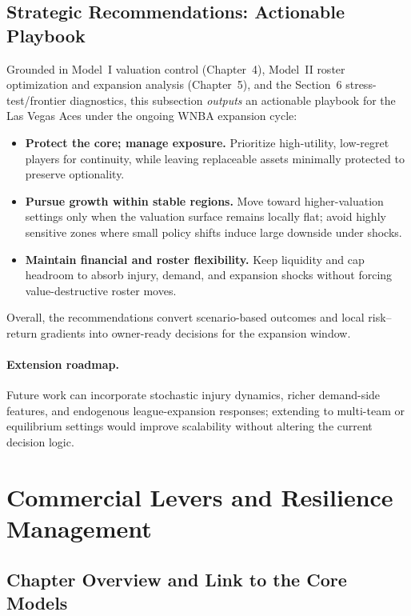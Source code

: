 \documentclass[12pt]{article}
\numberwithin{figure}{section}
\numberwithin{table}{section}
\begin{document}
	\subsection{Strategic Recommendations: Actionable Playbook}
	Grounded in Model~I valuation control (Chapter~4), Model~II roster optimization
	and expansion analysis (Chapter~5), and the Section~6 stress-test/frontier
	diagnostics, this subsection \emph{outputs} an actionable playbook for the Las Vegas Aces under the ongoing WNBA expansion cycle:
	\begin{itemize}
		\item \textbf{Protect the core; manage exposure.}
		Prioritize high-utility, low-regret players for continuity, while leaving
		replaceable assets minimally protected to preserve optionality.
		\item \textbf{Pursue growth within stable regions.}
		Move toward higher-valuation settings only when the valuation surface remains
		locally flat; avoid highly sensitive zones where small policy shifts induce
		large downside under shocks.
		\item \textbf{Maintain financial and roster flexibility.}
		Keep liquidity and cap headroom to absorb injury, demand, and expansion shocks
		without forcing value-destructive roster moves.
	\end{itemize}
	Overall, the recommendations convert scenario-based outcomes and local
	risk--return gradients into owner-ready decisions for the expansion window.
	
	\paragraph{Extension roadmap.}
	Future work can incorporate stochastic injury dynamics, richer demand-side
	features, and endogenous league-expansion responses; extending to multi-team or
	equilibrium settings would improve scalability without altering the current
	decision logic.
	
	
	
	\section{Commercial Levers and Resilience Management}
	
	
	\subsection{Chapter Overview and Link to the Core Models} 
	
\end{document}
